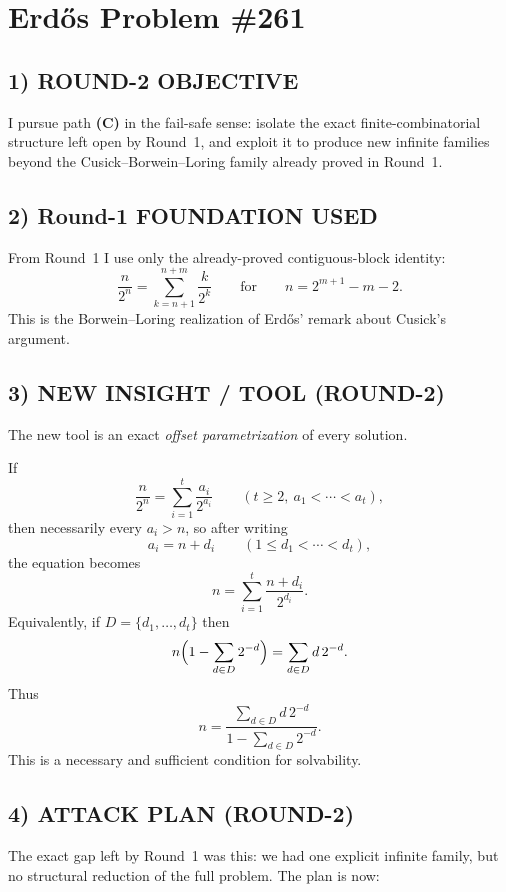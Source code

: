
\section{Erd\H{o}s Problem \#261}

\subsection*{1) ROUND-2 OBJECTIVE}

I pursue path \textbf{(C)} in the fail-safe sense: isolate the exact finite-combinatorial structure left open by Round~1, and exploit it to produce new infinite families beyond the Cusick--Borwein--Loring family already proved in Round~1.

\subsection*{2) Round-1 FOUNDATION USED}

From Round~1 I use only the already-proved contiguous-block identity:
\[
\frac{n}{2^n}=\sum_{k=n+1}^{n+m}\frac{k}{2^k}
\qquad\text{for}\qquad
n=2^{m+1}-m-2.
\]
This is the Borwein--Loring realization of Erd\H{o}s' remark about Cusick's argument.

\subsection*{3) NEW INSIGHT / TOOL (ROUND-2)}

The new tool is an exact \emph{offset parametrization} of every solution.

If
\[
\frac{n}{2^n}=\sum_{i=1}^{t}\frac{a_i}{2^{a_i}}
\qquad (t\geq 2,\ a_1<\cdots<a_t),
\]
then necessarily every $a_i>n$, so after writing
\[
a_i=n+d_i
\qquad (1\leq d_1<\cdots<d_t),
\]
the equation becomes
\[
n=\sum_{i=1}^{t}\frac{n+d_i}{2^{d_i}}.
\]
Equivalently, if $D=\{d_1,\dots,d_t\}$ then
\[
n\Bigl(1-\sum_{d\in D}2^{-d}\Bigr)=\sum_{d\in D} d\,2^{-d}.
\]
Thus
\[
n=\frac{\sum_{d\in D} d\,2^{-d}}{1-\sum_{d\in D}2^{-d}}.
\tag{261.1}
\]
This is a necessary and sufficient condition for solvability.

\subsection*{4) ATTACK PLAN (ROUND-2)}

The exact gap left by Round~1 was this: we had one explicit infinite family, but no structural reduction of the full problem.  The plan is now:

